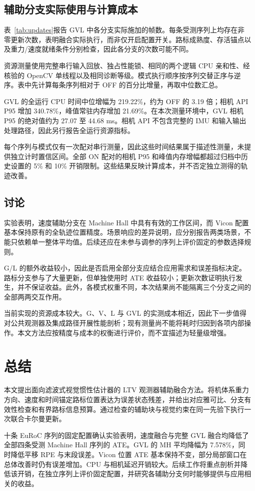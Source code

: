 \documentclass[a4paper,runningheads]{llncs}
\begin{document}
\subsection{辅助分支实际使用与计算成本}
表~\ref{tab:updates}报告 GVL 中各分支实际施加的帧数。每条受测序列上均存在非零更新次数，表明融合实际执行，而非仅开启配置开关。路标成熟度、存活锚点以及重力/速度就绪条件分别检查，因此各分支的次数可能不同。


资源测量使用完整串行输入回放、独占性能锁、相同的两个逻辑 CPU 亲和性、经核验的 OpenCV 单线程以及相同诊断等级。模式执行顺序按序列交替正序与逆序。表中先计算每条序列相对于 OFF 的百分比增量，再取中位数汇总。


GVL 的全运行 CPU 时间中位增幅为 219.22\%，约为 OFF 的 3.19 倍；相机 API P95 增加 340.78\%，峰值常驻内存增加 21.69\%。在本次测量环境中，GVL 相机 P95 的绝对值约为 27.07 至 44.68 ms。相机 API 不包含完整的 IMU 和输入输出处理路径，因此另行报告全运行资源指标。

每个序列与模式仅有一次配对串行测量，因此这些时间结果属于描述性测量，未提供独立计时置信区间。全部 ON 配对的相机 P95 和峰值内存增幅都超过归档中历史设置的 5\% 和 10\% 开销限制。这些结果反映计算成本，并不否定独立测得的轨迹改善。

\subsection{讨论}
实验表明，速度辅助分支在 Machine Hall 中具有有效的工作区间，而 Vicon 配置基本保持原有的全轨迹位置精度。场景响应的差异说明，应分别报告两类场景，不能只依赖单一整体平均值。后续还应在未参与调参的序列上评价固定的参数选择规则。

G/L 的额外收益较小，因此是否启用全部分支应结合应用需求和误差指标决定。路标分支参与了大量更新，但单独使用时 ATE 收益较小；更新次数证明执行发生，并不保证收益。此外，各模式权重不同，本次结果尚不能隔离三个分支之间的全部两两交互作用。

当前实现的资源成本较大。G、V、L 与 GVL 的实测成本相近，因此下一步值得对公共观测器及集成路径开展性能剖析；现有测量尚不能将耗时归因到各项内部操作。本文方法应按精度与成本的权衡进行评价，而不宜描述为轻量级增强。

\section{总结}
本文提出面向滤波式视觉惯性估计器的 LTV 观测器辅助融合方法。将机体系重力方向、速度和时间锚定路标位置表达为误差状态残差，并给出对应雅可比、分支有效性检查和有界路标信息预算。通过检查的辅助块与视觉约束在同一先验下执行一次联合卡尔曼更新。

十条 EuRoC 序列的固定配置确认实验表明，速度融合与完整 GVL 融合均降低了全部四条受测 Machine Hall 序列的 ATE。GVL 的 MH 平均降幅为 7.578\%，同时降低平移 RPE 与末段误差。Vicon 位置 ATE 基本保持不变，部分局部窗口在总体改善时仍有误差增加。CPU 与相机延迟开销较大。后续工作将重点剖析并降低该开销，在独立序列上评价固定配置，并研究各辅助分支何时能够提供与应用相关的收益。



\end{document}
